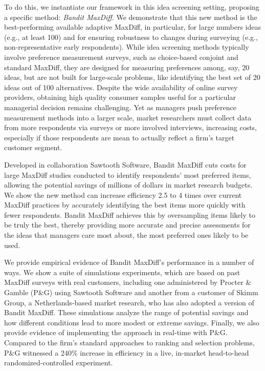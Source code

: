 \documentclass[nonblindrev]{informs3}
\begin{document}
To do this, we instantiate our framework in this idea screening setting, proposing a specific method: \emph{Bandit MaxDiff}. We demonstrate that this new method is the best-performing available adaptive MaxDiff, in particular, for large numbers ideas (e.g., at least 100) and for ensuring robustness to changes during surveying (e.g., non-representative early respondents). While idea screening methods typically involve preference measurement surveys, such as choice-based conjoint and standard MaxDiff, they are designed for measuring preferences among, say, 20 ideas, but are not built for large-scale problems, like identifying the best set of 20 ideas out of 100 alternatives. Despite the wide availability of online survey providers, obtaining high quality consumer samples useful for a particular managerial decision remains challenging. Yet as managers push preference measurement methods into a larger scale, market researchers must collect data from more respondents via surveys or more involved interviews, increasing costs, especially if those respondents are mean to actually reflect a firm's target customer segment.

Developed in collaboration Sawtooth Software, Bandit MaxDiff cuts costs for large MaxDiff studies conducted to identify respondents’ most preferred items, allowing the potential savings of millions of dollars in market research budgets. We show the new method can increase efficiency 2.5 to 4 times over current MaxDiff practices by accurately identifying the best items more quickly with fewer respondents. Bandit MaxDiff achieves this by oversampling items likely to be truly the best, thereby providing more accurate and precise assessments for the ideas that managers care most about, the most preferred ones likely to be used. 

We provide empirical evidence of Bandit MaxDiff's performance in a number of ways. We show a suite of simulations experiments, which are based on past MaxDiff surveys with real customers, including one administered by Procter \& Gamble (P\&G) using Sawtooth Software and another from a customer of Skimm Group, a Netherlands-based market research, who has also adopted a version of Bandit MaxDiff. These simulations analyze the range of potential savings and how different conditions lead to more modest or extreme savings. Finally, we also provide evidence of implementing the approach in real-time with P\&G. Compared to the firm's standard approaches to ranking and selection problems, P\&G witnessed a 240\% increase in efficiency in a live, in-market head-to-head randomized-controlled experiment.
\end{document}
